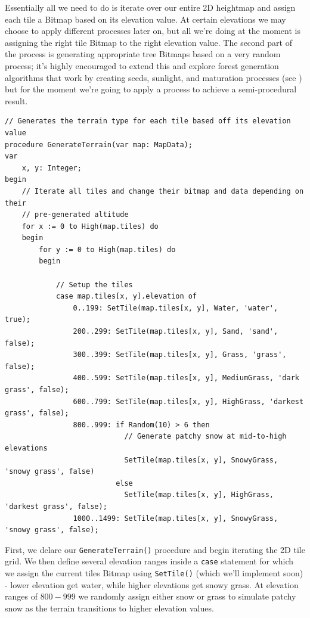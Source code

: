 \documentclass{article}
\begin{document}
Essentially all we need to do is iterate over our entire 2D heightmap and assign each tile a Bitmap based on its elevation value. At certain elevations we may choose to apply different processes later on, but all we're doing at the moment is assigning the right tile Bitmap to the right elevation value. The second part of the process is generating appropriate tree Bitmaps based on a very random process; it's highly encouraged to extend this and explore \label{forestalgo}forest generation algorithms that work by creating seeds, sunlight, and maturation processes (see \cite{forests}) but for the moment we're going to apply a process to achieve a semi-procedural result.

\begin{verbatim}
// Generates the terrain type for each tile based off its elevation value
procedure GenerateTerrain(var map: MapData);
var
	x, y: Integer;
begin
	// Iterate all tiles and change their bitmap and data depending on their
	// pre-generated altitude
	for x := 0 to High(map.tiles) do
	begin
		for y := 0 to High(map.tiles) do
		begin

			// Setup the tiles
			case map.tiles[x, y].elevation of
				0..199: SetTile(map.tiles[x, y], Water, 'water', true);
				200..299: SetTile(map.tiles[x, y], Sand, 'sand', false);
				300..399: SetTile(map.tiles[x, y], Grass, 'grass', false);
				400..599: SetTile(map.tiles[x, y], MediumGrass, 'dark grass', false);
				600..799: SetTile(map.tiles[x, y], HighGrass, 'darkest grass', false);
				800..999: if Random(10) > 6 then
							// Generate patchy snow at mid-to-high elevations
							SetTile(map.tiles[x, y], SnowyGrass, 'snowy grass', false)
						  else
							SetTile(map.tiles[x, y], HighGrass, 'darkest grass', false);
				1000..1499: SetTile(map.tiles[x, y], SnowyGrass, 'snowy grass', false);
\end{verbatim}

First, we delare our \texttt{GenerateTerrain()} procedure and begin iterating the 2D tile grid. We then define several elevation ranges inside a \texttt{case} statement for which we assign the current tiles Bitmap using \texttt{SetTile()} (which we'll implement soon) - lower elevation get water, while higher elevations get snowy grass. At elevation ranges of $800-999$ we randomly assign either snow or grass to simulate patchy snow as the terrain transitions to higher elevation values.
\end{document}
